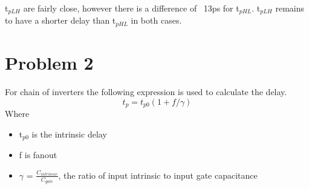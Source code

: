 \documentclass{article}
\begin{document}
t$_{pLH}$ are fairly close, however there is a difference of ~13ps for t$_{pHL}$. t$_{pLH}$  remains to have a shorter delay than t$_{pHL}$ in both cases.
   \newpage
   \section{Problem 2}
   For chain of inverters the following expression is used to calculate the delay.
   \begin{displaymath}
   t_{p}=t_{p0}(1+f/\gamma)
   \end{displaymath}
   Where
  \begin{itemize}
  \item t$_{p0}$ is the intrinsic delay
  \item f is fanout
  \item $\gamma$ =  $\frac{C_{intrinsic}}{C_{gate}}$, the ratio of input intrinsic to input gate capacitance
  \end{itemize}
\end{document}
